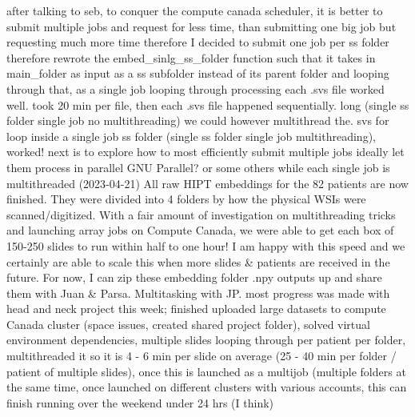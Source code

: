 \documentclass{article}%
\begin{document}
\newline%
\newline%
%
after talking to seb, to conquer the compute canada scheduler, it is better to submit multiple jobs and request for less time, than submitting one big job but requesting much more time%
\newline%
\newline%
%
therefore I decided to submit one job per ss folder %
\newline%
\newline%
%
therefore rewrote the embed\_sinlg\_ss\_folder function such that it takes in main\_folder as input as a ss subfolder instead of its parent folder and looping through that, as a single job looping through processing each .svs file worked well. took 20 min per file, then each .svs file happened sequentially. long (single ss folder single job no multithreading)%
\newline%
\newline%
%
we could however multithread the. svs for loop inside a single job ss folder (single ss folder single job multithreading), worked! %
\newline%
\newline%
%
next is to explore how to most efficiently submit multiple jobs ideally let them process in parallel GNU Parallel? or some others while each single job is multithreaded%
\newline%
\newline%
%
(2023{-}04{-}21) All raw HIPT embeddings for the 82 patients are now finished. They were divided into 4 folders by how the physical WSIs were scanned/digitized. With a fair amount of investigation on multithreading tricks and launching array jobs on Compute Canada, we were able to get each box of 150{-}250 slides to run within half to one hour! I am happy with this speed and we certainly are able to scale this when more slides \& patients are received in the future. For now, I can zip these embedding folder .npy outputs up and share them with Juan \& Parsa. Multitasking with JP. %
\newline%
\newline%
%
%
\newline%
\newline%
%
most progress was made with head and neck project this week; finished uploaded large datasets to compute Canada cluster (space issues, created shared project folder), solved virtual environment dependencies, multiple slides looping through per patient per folder, multithreaded it so it is 4 {-} 6 min per slide on average (25 {-} 40 min per folder / patient of multiple slides), once this is launched as a multijob (multiple folders at the same time, once launched on different clusters with various accounts, this can finish running over the weekend under 24 hrs (I think)%
\end{document}
